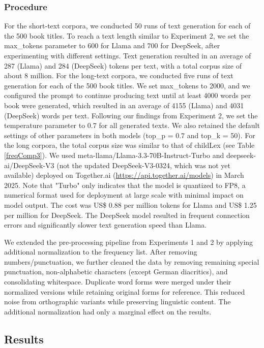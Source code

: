 \documentclass[doc, a4paper, anonymous]{apa7}
\begin{document}
\subsubsection{Procedure}

For the short-text corpora, we conducted 50 runs of text generation for each of the 500 book titles. To reach a text length similar to Experiment 2, we set the max\_tokens parameter to 600 for Llama and 700 for DeepSeek, after experimenting with different settings. Text generation resulted in an average of 287 (Llama) and 284 (DeepSeek) tokens per text, with a total corpus size of about 8 million. For the long-text corpora, we conducted five runs of text generation for each of the 500 book titles. We set max\_tokens to 2000, and we configured the prompt to continue producing text until at least 4000 words per book were generated, which resulted in an average of 4155 (Llama) and 4031 (DeepSeek) words per text. Following our findings from Experiment 2, we set the temperature parameter to 0.7 for all generated texts. We also retained the default settings of other parameters in both models (top\_p = 0.7 and top\_k = 50). For the long corpora, the total corpus size was similar to that of childLex (see Table \ref{freqComp3}). We used meta-llama/Llama-3.3-70B-Instruct-Turbo and deepseek-ai/DeepSeek-V3 (not the updated DeepSeek-V3-0324, which was not yet available) deployed on Together.ai (\url{https://api.together.ai/models}) in March 2025. Note that "Turbo" only indicates that the model is quantized to FP8, a numerical format used for deployment at large scale with minimal impact on model output. The cost was US\$ 0.88 per million tokens for Llama and US\$ 1.25 per million for DeepSeek. The DeepSeek model resulted in frequent connection errors and significantly slower text generation speed than Llama. 

We extended the pre-processing pipeline from Experiments 1 and 2 by applying additional normalization to the frequency list. After removing numbers/punctuation, we further cleaned the data by removing remaining special punctuation, non-alphabetic characters (except German diacritics), and consolidating whitespace. Duplicate word forms were merged under their normalized versions while retaining original forms for reference. This reduced noise from orthographic variants while preserving linguistic content. The additional normalization had only a marginal effect on the results. 

\subsection{Results}
\end{document}
